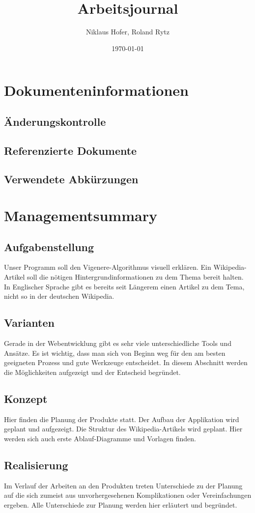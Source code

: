 \documentclass[11pt,paper=a4,final]{scrartcl}
\title{Arbeitsjournal}
\author{Niklaus Hofer, Roland Rytz}
\date{\today{}}
\begin{document}
\maketitle
\newpage
\section{Dokumenteninformationen}
\subsection{\"Anderungskontrolle}
\subsection{Referenzierte Dokumente}
\subsection{Verwendete Abk\"urzungen}
\tableofcontents
\listoffigures
\listoftables
\section{Managementsummary}
\subsection{Aufgabenstellung}
Unser Programm soll den Vigenere-Algorithmus visuell erkl\"aren. Ein
Wikipedia-Artikel soll die n\"otigen Hintergrundinformationen zu dem Thema
bereit halten. In Englischer Sprache gibt es bereits seit L\"angerem einen
Artikel zu dem Tema, nicht so in der deutschen Wikipedia.
\subsection{Varianten}
Gerade in der Webentwicklung gibt es sehr viele unterschiedliche Tools und
Ans\"atze. Es ist wichtig, dass man sich von Beginn weg f\"ur den am besten
geeigneten Prozess und gute Werkzeuge entscheidet. In diesem Abschnitt werden
die M\"oglichkeiten aufgezeigt und der Entscheid begr\"undet.
\subsection{Konzept}
Hier finden die Planung der Produkte statt. Der Aufbau der Applikation wird
geplant und aufgezeigt. Die Struktur des Wikipedia-Artikels wird geplant. Hier
werden sich auch erste Ablauf-Diagramme und Vorlagen finden.
\subsection{Realisierung}
Im Verlauf der Arbeiten an den Produkten treten Unterschiede zu der Planung auf
die sich zumeist aus unvorhergesehenen Komplikationen oder Vereinfachungen
ergeben. Alle Unterschiede zur Planung werden hier erl\"autert und begr\"undet.
\end{document}
